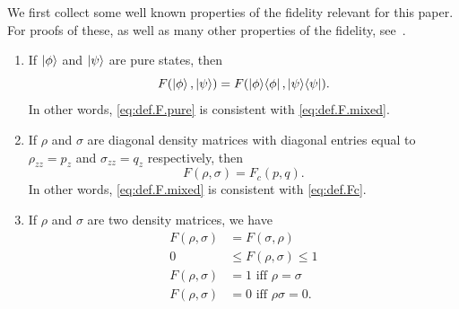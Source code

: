 \documentclass[american,aps,pra,reprint,floatfix,nofootinbib,superscriptaddress]{revtex4-2}
\newtheorem{theorem}{Theorem}
\newcommand{\bes} {\begin{subequations}}
\newcommand{\ees} {\end{subequations}}
\begin{document}
We first collect some well known properties of the fidelity relevant for this
paper. For proofs of these, as well as many other properties of the fidelity,
see~\cite[\S 9]{nielsen-chuang-2010}.
  \begin{enumerate}
    \item If $\ket{\phi}$ and $\ket{\psi}$ are pure states, then
      \begin{equation}
        F(\ket{\phi}, \ket{\psi}) =
          F(\ket{\phi}\!\bra{\phi}, \ket{\psi}\!\bra{\psi}).
      \end{equation}
      In other words, \cref{eq:def.F.pure} is consistent with
      \cref{eq:def.F.mixed}.
    \item If $\rho$ and $\sigma$ are diagonal density matrices with diagonal
      entries equal to $\rho_{zz} = p_z$ and $\sigma_{zz} = q_z$ respectively, then
      \begin{equation}
        F(\rho, \sigma) = F_c(p, q).
      \end{equation}
      In other words, \cref{eq:def.F.mixed} is consistent with \cref{eq:def.Fc}.
    \item If $\rho$ and $\sigma$ are two density matrices, we have
    \bes
      \begin{align}
        \label{eq:prop.F.1}
        F(\rho, \sigma) &= F(\sigma, \rho) \\
        \label{eq:prop.F.2}
        0 &\leq F(\rho, \sigma) \leq 1 \\
        \label{eq:prop.F.3}
        F(\rho, \sigma) &= 1 \textrm{ iff } \rho = \sigma \\
        \label{eq:prop.F.4}
        F(\rho, \sigma) &= 0 \textrm{ iff } \rho \sigma = 0.
      \end{align}
    \ees
\end{enumerate}
\end{document}
